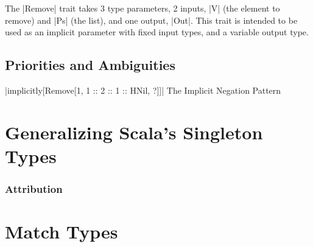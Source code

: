 

The |Remove| trait takes 3 type parameters, 2 inputs, |V| (the element to remove) and |Ps| (the list), and one output, |Out|.
This trait is intended to be used as an implicit parameter with fixed input types, and a variable output type.




\section{Priorities and Ambiguities}

|implicitly[Remove[1, 1 :: 2 :: 1 :: HNil, ?]]|
The Implicit Negation Pattern

\chapter{Generalizing Scala's Singleton Types}
\label{chap:generalizing-scala-s-singleton-types}
\subsection*{Attribution}
\citep{shmid2020coming}
\lipsum[1]

\chapter{Match Types}
\label{chap:match-types}
